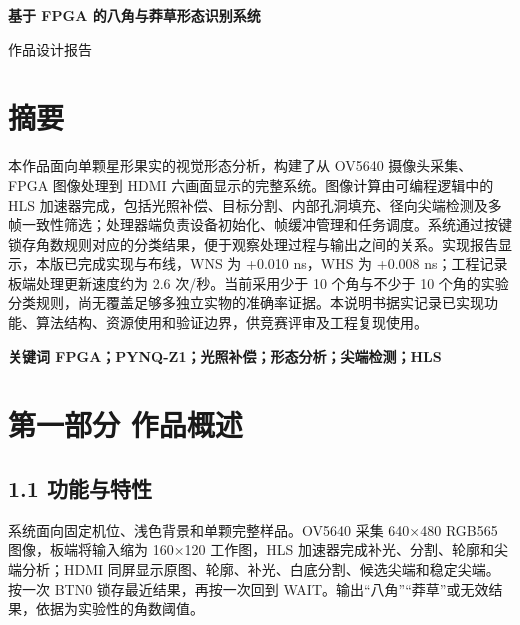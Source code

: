 \documentclass[UTF8,fontset=windows,a4paper,11pt]{ctexart}
\begin{document}
\begin{center}
{\LARGE\bfseries 基于 FPGA 的八角与莽草形态识别系统\par}
\vspace{.45em}
{\large 作品设计报告\par}
\end{center}


\section*{摘要}

本作品面向单颗星形果实的视觉形态分析，构建了从 OV5640 摄像头采集、FPGA 图像处理到 HDMI 六画面显示的完整系统。图像计算由可编程逻辑中的 HLS 加速器完成，包括光照补偿、目标分割、内部孔洞填充、径向尖端检测及多帧一致性筛选；处理器端负责设备初始化、帧缓冲管理和任务调度。系统通过按键锁存角数规则对应的分类结果，便于观察处理过程与输出之间的关系。实现报告显示，本版已完成实现与布线，WNS 为 +0.010 ns，WHS 为 +0.008 ns；工程记录板端处理更新速度约为 2.6 次/秒。当前采用少于 10 个角与不少于 10 个角的实验分类规则，尚无覆盖足够多独立实物的准确率证据。本说明书据实记录已实现功能、算法结构、资源使用和验证边界，供竞赛评审及工程复现使用。\par

\noindent\textbf{关键词  FPGA；PYNQ-Z1；光照补偿；形态分析；尖端检测；HLS}

\section*{第一部分 作品概述}

\subsection*{1.1 功能与特性}

系统面向固定机位、浅色背景和单颗完整样品。OV5640 采集 640×480 RGB565 图像，板端将输入缩为 160×120 工作图，HLS 加速器完成补光、分割、轮廓和尖端分析；HDMI 同屏显示原图、轮廓、补光、白底分割、候选尖端和稳定尖端。按一次 BTN0 锁存最近结果，再按一次回到 WAIT。输出“八角”“莽草”或无效结果，依据为实验性的角数阈值。\par
\end{document}
